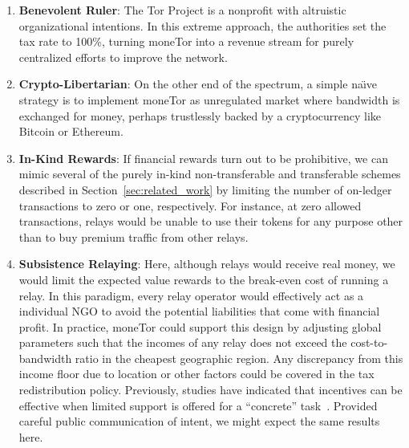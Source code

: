 \begin{enumerate}

\item \textbf{Benevolent Ruler}: The Tor Project is a nonprofit with
altruistic organizational intentions. In this extreme approach, the
authorities set the tax rate to 100\%, turning moneTor into a revenue stream for
purely centralized efforts to improve the network.

\item \textbf{Crypto-Libertarian}: On the other end of the spectrum, a simple
na\"{\i}ve strategy is to implement moneTor as unregulated market where bandwidth is
exchanged for money, perhaps trustlessly backed by a cryptocurrency like Bitcoin
or Ethereum.

\item \textbf{In-Kind Rewards}: If financial rewards turn out to be
  prohibitive, we can mimic several of the purely in-kind non-transferable and
  transferable schemes described in Section~\ref{sec:related_work} by limiting
  the number of on-ledger transactions to zero or one, respectively. For
  instance, at zero allowed transactions, relays would be unable to use their
  tokens for any purpose other than to buy premium traffic from other relays.

\item \textbf{Subsistence Relaying}: Here, although relays would receive real money,
  we would limit the expected value rewards to the break-even cost of running a
  relay. In this paradigm, every relay operator would effectively act as a
  individual NGO to avoid the potential liabilities that come with financial
  profit. In practice, moneTor could support this design by adjusting global
  parameters such that the incomes of any relay does not exceed the
  cost-to-bandwidth ratio in the cheapest geographic region. Any discrepancy
  from this income floor due to location or other factors could be covered in
  the tax redistribution policy. Previously, studies have indicated that
  incentives can be effective when limited support is offered for a ``concrete''
  task~\cite{10.1257/jep.25.4.191, 10.1086/431263}. Provided careful public
  communication of intent, we might expect the same results here.


\end{enumerate}
